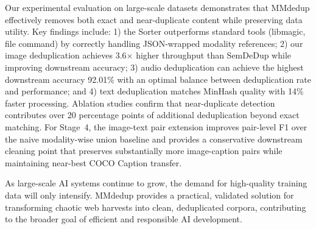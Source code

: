 \documentclass[conference]{IEEEtran}
\begin{document}
Our experimental evaluation on large-scale datasets demonstrates that MMdedup effectively removes both exact and near-duplicate content while preserving data utility. Key findings include: 1) the Sorter outperforms standard tools (libmagic, file command) by correctly handling JSON-wrapped modality references; 2) our image deduplication achieves 3.6$\times$ higher throughput than SemDeDup while improving downstream accuracy; 3) audio deduplication can achieve the highest downstream accuracy 92.01\% with an optimal balance between deduplication rate and performance; and 4) text deduplication matches MinHash quality with 14\% faster processing. Ablation studies confirm that near-duplicate detection contributes over 20 percentage points of additional deduplication beyond exact matching. For Stage~4, the image-text pair extension improves pair-level F1 over the naive modality-wise union baseline and provides a conservative downstream cleaning point that preserves substantially more image-caption pairs while maintaining near-best COCO Caption transfer.

As large-scale AI systems continue to grow, the demand for high-quality training data will only intensify. MMdedup provides a practical, validated solution for transforming chaotic web harvests into clean, deduplicated corpora, contributing to the broader goal of efficient and responsible AI development.
\end{document}
